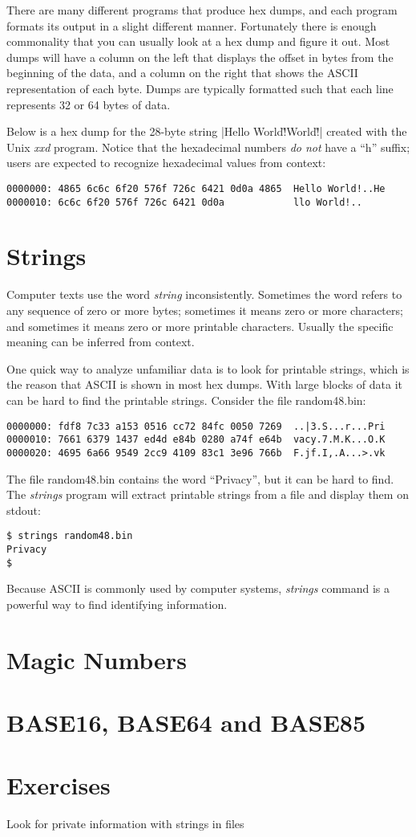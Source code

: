 There are many different programs that produce hex dumps, and each
program formats its output in a slight different manner. Fortunately
there is enough commonality that you can usually look at a hex dump
and figure it out. Most dumps will have a column on the left that
displays the offset in bytes from the beginning of the data, and a
column on the right that shows the ASCII representation of each
byte. Dumps are typically formatted such that each line represents 32
or 64 bytes of data.

Below is a hex dump for the 28-byte string 
|Hello World!\r\nHello World!\r\n| created with the Unix \emph{xxd}
program. Notice that the hexadecimal numbers \emph{do not} have a
``h'' suffix; users are expected to recognize hexadecimal values from
context:

\begin{Verbatim}
0000000: 4865 6c6c 6f20 576f 726c 6421 0d0a 4865  Hello World!..He
0000010: 6c6c 6f20 576f 726c 6421 0d0a            llo World!..
\end{Verbatim}


\section{Strings}\label{sec:strings}

Computer texts use the word \emph{string} inconsistently. Sometimes
the word refers to any sequence of zero or more bytes; sometimes it
means zero or more characters; and sometimes it means zero or
more printable characters. Usually the specific meaning can be
inferred from context. 

One quick way to analyze unfamiliar data is to look for printable
strings, which is the reason that ASCII is shown in most hex
dumps. With large blocks of data it can be hard to find the printable
strings. Consider the file random48.bin:

\begin{Verbatim}
0000000: fdf8 7c33 a153 0516 cc72 84fc 0050 7269  ..|3.S...r...Pri
0000010: 7661 6379 1437 ed4d e84b 0280 a74f e64b  vacy.7.M.K...O.K
0000020: 4695 6a66 9549 2cc9 4109 83c1 3e96 766b  F.jf.I,.A...>.vk
\end{Verbatim}

The file random48.bin contains the word ``Privacy'', but it can be hard to
find. The \emph{strings} program will extract printable
strings from a file and display them on stdout:

\begin{Verbatim}
$ strings random48.bin 
Privacy
$ 
\end{Verbatim}

Because ASCII is commonly used by computer systems, 
\emph{strings} command is a powerful way to find  identifying
information. 

\section{Magic Numbers}

\section{BASE16, BASE64 and BASE85}

\section{Exercises}
Look for private information with strings in files



